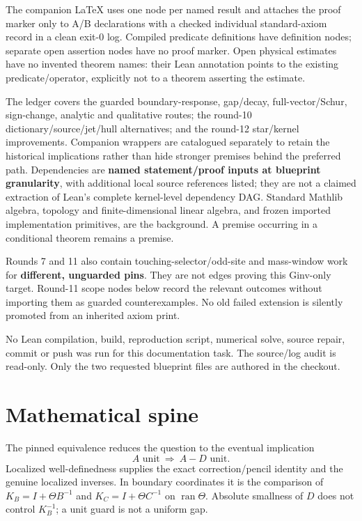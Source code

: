 The companion LaTeX uses one node per named result and attaches the proof marker only to A/B declarations with a checked individual standard-axiom record in a clean exit-0 log. Compiled predicate definitions have definition nodes; separate open assertion nodes have no proof marker. Open physical estimates have no invented theorem names: their Lean annotation points to the existing predicate/operator, explicitly not to a theorem asserting the estimate.

The ledger covers the guarded boundary-response, gap/decay, full-vector/Schur, sign-change, analytic and qualitative routes; the round-10 dictionary/source/jet/hull alternatives; and the round-12 star/kernel improvements. Companion wrappers are catalogued separately to retain the historical implications rather than hide stronger premises behind the preferred path. Dependencies are \textbf{named statement/proof inputs at blueprint granularity}, with additional local source references listed; they are not a claimed extraction of Lean's complete kernel-level dependency DAG. Standard Mathlib algebra, topology and finite-dimensional linear algebra, and frozen imported implementation primitives, are the background. A premise occurring in a conditional theorem remains a premise.

Rounds 7 and 11 also contain touching-selector/odd-site and mass-window work for \textbf{different, unguarded pins}. They are not edges proving this Ginv-only target. Round-11 scope nodes below record the relevant outcomes without importing them as guarded counterexamples. No old failed extension is silently promoted from an inherited axiom print.

No Lean compilation, build, reproduction script, numerical solve, source repair, commit or push was run for this documentation task. The source/log audit is read-only. Only the two requested blueprint files are authored in the checkout.

\section{Mathematical spine}

The pinned equivalence reduces the question to the eventual implication
\[
 A\text{ unit}\ \Longrightarrow\ A-D\text{ unit}.
\]
Localized well-definedness supplies the exact correction/pencil identity and the genuine localized inverses. In boundary coordinates it is the comparison of \(K_B=I+\Theta B^{-1}\) and \(K_C=I+\Theta C^{-1}\) on \(\operatorname{ran}\Theta\). Absolute smallness of \(D\) does not control \(K_B^{-1}\); a unit guard is not a uniform gap.

